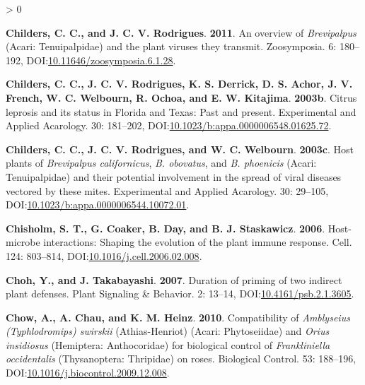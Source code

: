 \documentclass{ufdissertation}[overrideChapters] %
\newlength{\cslhangindent}
\newenvironment{CSLReferences}[2] %
 {%
  \setlength{\parindent}{0pt}
  \ifodd #1 \everypar{\setlength{\hangindent}{\cslhangindent}}\ignorespaces\fi
  \ifnum #2 > 0
  \setlength{\parskip}{#2\baselineskip}
  \fi
 }%
 {}
\begin{document}
{\begin{CSLReferences}{1}{1}
\leavevmode{}%
\textbf{Childers, C. C., and J. C. V. Rodrigues}. \textbf{2011}. An overview of {\emph{Brevipalpus}} ({Acari}: {Tenuipalpidae}) and the plant viruses they transmit. Zoosymposia. 6: 180--192, DOI:\href{https://doi.org/10.11646/zoosymposia.6.1.28}{10.11646/zoosymposia.6.1.28}.

\leavevmode{}%
\textbf{Childers, C. C., J. C. V. Rodrigues, K. S. Derrick, D. S. Achor, J. V. French, W. C. Welbourn, R. Ochoa, and E. W. Kitajima}. \textbf{2003b}. {Citrus leprosis} and its status in {Florida} and {Texas}: Past and present. Experimental and Applied Acarology. 30: 181--202, DOI:\href{https://doi.org/10.1023/b:appa.0000006548.01625.72}{10.1023/b:appa.0000006548.01625.72}.

\leavevmode{}%
\textbf{Childers, C. C., J. C. V. Rodrigues, and W. C. Welbourn}. \textbf{2003c}. Host plants of {\emph{Brevipalpus californicus}}, {\emph{B. obovatus}}, and {\emph{B. phoenicis}} ({Acari}: {Tenuipalpidae}) and their potential involvement in the spread of viral diseases vectored by these mites. Experimental and Applied Acarology. 30: 29--105, DOI:\href{https://doi.org/10.1023/b:appa.0000006544.10072.01}{10.1023/b:appa.0000006544.10072.01}.

\leavevmode{}%
\textbf{Chisholm, S. T., G. Coaker, B. Day, and B. J. Staskawicz}. \textbf{2006}. Host-microbe interactions: Shaping the evolution of the plant immune response. Cell. 124: 803--814, DOI:\href{https://doi.org/10.1016/j.cell.2006.02.008}{10.1016/j.cell.2006.02.008}.

\leavevmode{}%
\textbf{Choh, Y., and J. Takabayashi}. \textbf{2007}. Duration of priming of two indirect plant defenses. Plant Signaling {\&} Behavior. 2: 13--14, DOI:\href{https://doi.org/10.4161/psb.2.1.3605}{10.4161/psb.2.1.3605}.

\leavevmode{}%
\textbf{Chow, A., A. Chau, and K. M. Heinz}. \textbf{2010}. Compatibility of {\emph{Amblyseius (Typhlodromips) swirskii}} ({Athias-Henriot}) ({Acari: Phytoseiidae}) and {\emph{Orius insidiosus}} ({Hemiptera}: {Anthocoridae}) for biological control of {\emph{Frankliniella occidentalis}} ({Thysanoptera:} {Thripidae}) on roses. Biological Control. 53: 188--196, DOI:\href{https://doi.org/10.1016/j.biocontrol.2009.12.008}{10.1016/j.biocontrol.2009.12.008}.


\end{CSLReferences}}
\end{document}
